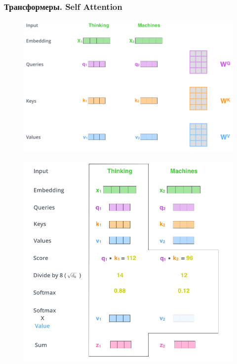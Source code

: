 \documentclass[notheorems, handout]{beamer}
\begin{document}
	\begin{frame}
	\frametitle{Трансформеры. Self Attention}
		\begin{figure}[H]
			\begin{center}
				\includegraphics[scale=0.15]{img/transf3.png}
			\end{center}
		\end{figure}
		
		\begin{figure}[H]
			\begin{center}
				\includegraphics[scale=0.15]{img/transf4.png}
			\end{center}
		\end{figure}
	\end{frame}
	
\end{document}
